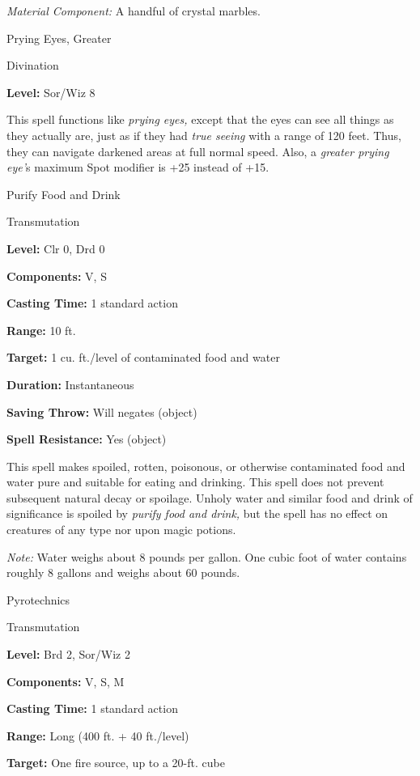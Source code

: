 \documentclass{article}
\begin{document}
\textit{Material Component: }A handful of crystal marbles.

\vspace{12pt}
Prying Eyes, Greater

Divination

\textbf{Level:} Sor/Wiz 8

This spell functions like \textit{prying eyes, }except that the eyes can see all 
things as they actually are, just as if they had \textit{true seeing }with a range 
of 120 feet. Thus, they can navigate darkened areas at full normal speed. Also, 
a \textit{greater prying eye'}s maximum Spot modifier is +25 instead of +15.

\vspace{12pt}
Purify Food and Drink

Transmutation

\textbf{Level:} Clr 0, Drd 0

\textbf{Components:} V, S

\textbf{Casting Time:} 1 standard action

\textbf{Range:} 10 ft.

\textbf{Target:} 1 cu. ft./level of contaminated food and water

\textbf{Duration:} Instantaneous

\textbf{Saving Throw: }Will negates (object)

\textbf{Spell Resistance:} Yes (object)

This spell makes spoiled, rotten, poisonous, or otherwise contaminated food and 
water pure and suitable for eating and drinking. This spell does not prevent subsequent 
natural decay or spoilage. Unholy water and similar food and drink of significance 
is spoiled by \textit{purify food and drink, }but the spell has no effect on creatures 
of any type nor upon magic potions.

\textit{Note: }Water weighs about 8 pounds per gallon. One cubic foot of water 
contains roughly 8 gallons and weighs about 60 pounds.

\vspace{12pt}
Pyrotechnics

Transmutation

\textbf{Level:} Brd 2, Sor/Wiz 2

\textbf{Components:} V, S, M

\textbf{Casting Time:} 1 standard action

\textbf{Range:} Long (400 ft. + 40 ft./level)

\textbf{Target:} One fire source, up to a 20-ft. cube
\end{document}
